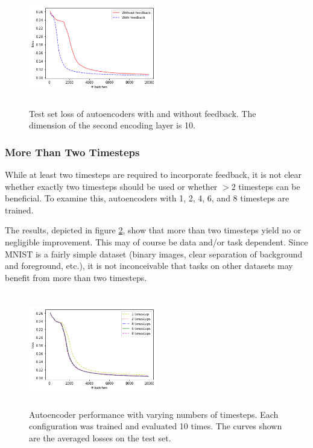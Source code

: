 \documentclass{article}
\begin{document}
\begin{figure}
      \centering
      \includegraphics[width=0.5\textwidth,height=5cm,keepaspectratio]{img/mnist10test.png}
      \caption{Test set loss of autoencoders with and without feedback. The dimension of the second encoding layer is 10. }
      \label{fig:fbvsnofb10}
  \end{figure}
  
\subsubsection{More Than Two Timesteps}
\label{timesteps}
While at least two timesteps are required to incorporate feedback, it is not clear whether exactly two timesteps should be used or whether $>2$ timesteps can be beneficial. To examine this, autoencoders with 1, 2, 4, 6, and 8 timesteps are trained. 

The results, depicted in figure \ref{fig:timesteps}, show that more than two timesteps yield no or negligible improvement. This may of course be data and/or task dependent. Since MNIST is a fairly simple dataset (binary images, clear separation of background and foreground, etc.), it is not inconceivable that tasks on other datasets may benefit from more than two timesteps. 




\begin{figure}
      \centering
      \includegraphics[width=0.5\textwidth,height=5cm,keepaspectratio]{img/timesteps_test.png}
      \caption{Autoencoder performance with varying numbers of timesteps. Each configuration was trained and evaluated 10 times. The curves shown are the averaged losses on the test set.}
      \label{fig:timesteps}
  \end{figure}
 
\end{document}
